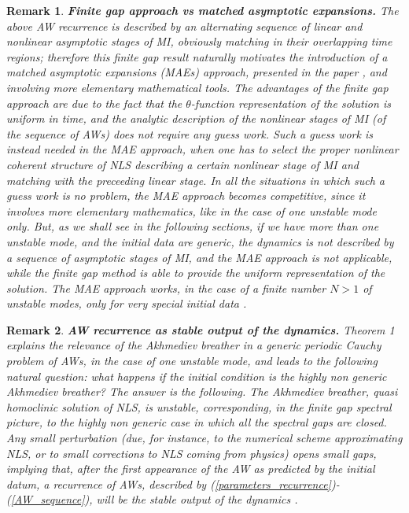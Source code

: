 \documentclass[12pt]{article}
\newtheorem{remark}{Remark}
\begin{document}
\begin{remark}
{\bf Finite gap approach vs matched asymptotic expansions.} The above AW recurrence is described by an alternating sequence of linear and nonlinear asymptotic stages of MI, obviously matching in their overlapping time regions; therefore this finite gap result naturally motivates the introduction of a matched asymptotic expansions (MAEs) approach, presented in the paper \cite{GS2}, and involving more elementary mathematical tools. The advantages of the finite gap approach are due to the fact that the $\theta$-function representation of the solution is uniform in time, and the analytic description of the nonlinear stages of MI (of the sequence of AWs) does not require any guess work. Such a guess work is instead needed in the MAE approach, when one has to select the proper nonlinear coherent structure of NLS describing a certain nonlinear stage of MI and matching with the preceeding linear stage. In all the situations in which such a guess work is no problem, the MAE approach becomes competitive, since it involves more elementary mathematics, like in the case of one unstable mode only. But, as we shall see in the following sections, if we have more than one unstable mode, and the initial data are generic, the dynamics is not described by a sequence of asymptotic stages of MI, and the MAE approach is not applicable, while the finite gap method is able to provide the uniform representation of the solution. The MAE approach works, in the case of a finite number $N>1$ of unstable modes, only for very special initial data \cite{GS2}.   
\end{remark}  
\begin{remark}
{\bf AW recurrence as stable output of the dynamics. } Theorem 1 explains the relevance of the Akhmediev breather in a generic periodic Cauchy problem of AWs, in the case of one unstable mode, and leads to the following natural question: what happens if the initial condition is the highly non generic Akhmediev breather? The answer is the following. The Akhmediev breather, quasi homoclinic solution of NLS, is unstable, corresponding, in the finite gap spectral picture, to the highly non generic case in which all the spectral gaps are closed. Any small perturbation (due, for instance, to the numerical scheme approximating NLS, or to small corrections to NLS coming from physics) opens small gaps, implying that, after the first appearance of the AW as predicted by the initial datum, a recurrence of AWs, described by (\ref{parameters_recurrence})-(\ref{AW_sequence}), will be the stable output of the dynamics \cite{GS3}.
\end{remark}
\end{document}

